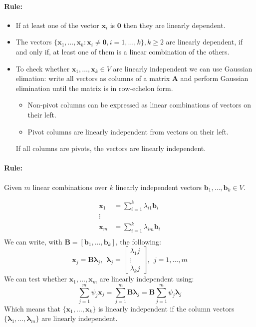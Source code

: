 \documentclass[12pt]{article}
\newcommand{\bx}{{\bm{x}}}
\newcommand{\A}{{\bm{A}}}
\newcommand{\B}{{\bm{B}}}
\newcommand{\vecs}[2]{{\bm{#1}_1, \dots, \bm{#1}_#2}}
\newcommand{\xrule}[1]{\paragraph{\colorbox{#1!30}{\textbf{Rule:}}}}
\begin{document}
\xrule{red}
%
\begin{itemize}
  \item If at least one of the vector $\bm{x}_i$ is $\bm{0}$ then they are linearly dependent.
  \item The vectors $\{\bx_1, \dots, \bx_k : \bx_i \neq \bm0, i =1, \dots, k\} , k \geqslant 2$ are linearly dependent, if and only if, at least one of them is a linear combination of the others.
  \item To check whether $\bx_1, \dots, \bx_k \in V$ are linearly independent we can use Gaussian elimation: write all vectors as columns of a matrix $\A$ and perform Gaussian elimination until the matrix is in row-echelon form.\begin{itemize}
  \item Non-pivot columns can be expressed as linear combinations of vectors on their left.
  \item Pivot columns are linearly independent from vectors on their left.
	  \end{itemize}
	  If all columns are pivots, the vectors are linearly independent.
\end{itemize}

\xrule{red} Given $m$ linear combinations over $k$ linearly independent vectors $\bm{b}_1, \dots, \bm{b}_k \in V$.

\begin{equation}
	\begin{aligned}
		\bx_1 &= \sum\limits_{i=1}^k \lambda_{i1} \bm{b}_i \\
		\vdots & \\
		\bx_m &= \sum\limits_{i=1}^k \lambda_{im} \bm{b}_i \\
	\end{aligned}
\end{equation}
%
We can write, with $\B = [\bm{b}_1, \dots, \bm{b}_k]$, the following:
%
\begin{equation}
	\bx_j = \bm{B} \bm{\lambda}_j, \ \ \bm{\lambda}_j = \begin{bmatrix}
		\lambda_1j \\
		\vdots \\
		\lambda_kj
	\end{bmatrix}, \ \ j = 1, \dots,m 
\end{equation}
%
We can test whether $\bx_1, \dots, \bx_m$ are linearly independent using:
\begin{equation}
	\sum\limits_{j=1}^m \psi_j \bx_j = \sum\limits_{j=1}^m \B\bm{\lambda}_j = \B \sum\limits_{j=1}^m \psi_j \bm{\lambda}_j
\end{equation}
%
Which means that $\{\vecs{x}{k}\}$ is linearly independent if the column vectors $\{\vecs{\lambda}{m}\}$ are linearly independent.
\end{document}
